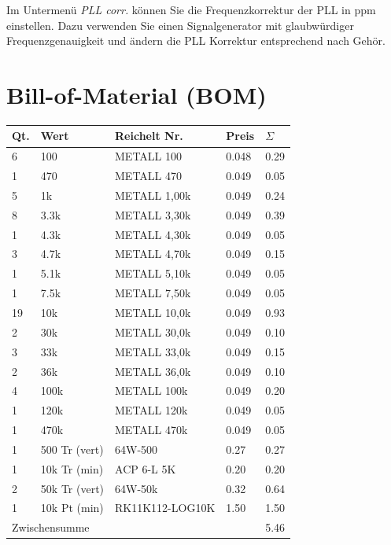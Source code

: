 \documentclass[10pt, a4paper]{paper}
\begin{document}
Im Untermenü \emph{PLL corr.} können Sie die Frequenzkorrektur der PLL in ppm einstellen. Dazu verwenden Sie einen Signalgenerator mit glaubwürdiger Frequenzgenauigkeit und ändern die PLL Korrektur entsprechend nach Gehör.


\clearpage
\section{Bill-of-Material (BOM)}
\begin{longtable}{|p{}|p{}|p{}|p{}|p{}|}\hline
Qt.& Wert         & Reichelt Nr.    & Preis & $\Sigma$ \\\hline \hline
 6 & 100          & METALL 100      & 0.048 & 0.29 \\
 1 & 470          & METALL 470      & 0.049 & 0.05 \\
 5 & 1k           & METALL 1,00k    & 0.049 & 0.24 \\
 8 & 3.3k         & METALL 3,30k    & 0.049 & 0.39 \\
 1 & 4.3k         & METALL 4,30k    & 0.049 & 0.05 \\
 3 & 4.7k         & METALL 4,70k    & 0.049 & 0.15 \\
 1 & 5.1k         & METALL 5,10k    & 0.049 & 0.05 \\
 1 & 7.5k         & METALL 7,50k    & 0.049 & 0.05 \\
19 & 10k          & METALL 10,0k    & 0.049 & 0.93 \\
 2 & 30k          & METALL 30,0k    & 0.049 & 0.10 \\
 3 & 33k          & METALL 33,0k    & 0.049 & 0.15 \\
 2 & 36k          & METALL 36,0k    & 0.049 & 0.10 \\
 4 & 100k         & METALL 100k     & 0.049 & 0.20 \\
 1 & 120k         & METALL 120k     & 0.049 & 0.05 \\
 1 & 470k         & METALL 470k     & 0.049 & 0.05 \\
 1 & 500 Tr (vert)& 64W-500         & 0.27  & 0.27 \\
 1 & 10k Tr (min) & ACP 6-L 5K      & 0.20  & 0.20 \\
 2 & 50k Tr (vert)& 64W-50k         & 0.32  & 0.64 \\
 1 & 10k Pt (min) & RK11K112-LOG10K & 1.50  & 1.50 \\ \hline
 \multicolumn{4}{|l|}{Zwischensumme}        & 5.46 \\ \hline 

\end{longtable}
\end{document}
